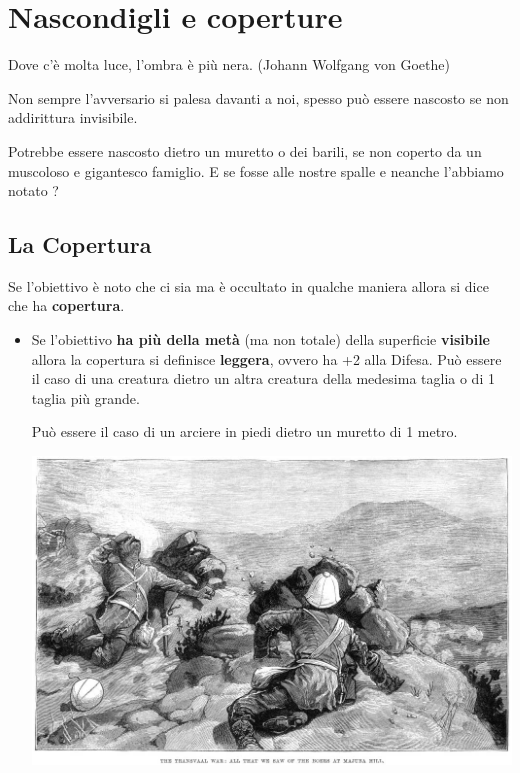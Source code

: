 \section{Nascondigli e coperture} 

\begin{enfasi}
Dove c'è molta luce, l'ombra è più nera. (Johann Wolfgang von Goethe)
\end{enfasi}

\begin{multicols}{2}

Non sempre l'avversario si palesa davanti a noi, spesso può essere nascosto se non addirittura invisibile.

Potrebbe essere nascosto dietro un muretto o dei barili, se non coperto da un muscoloso e gigantesco famiglio.
E se fosse alle nostre spalle e neanche l'abbiamo notato ?

\subsection{La Copertura} \label{copertura}\hypertarget{copertura}{}

Se l'obiettivo è noto che ci sia ma è occultato in qualche maniera allora si dice che ha \textbf{copertura}.

\begin{itemize}[leftmargin=*] \setlength{\itemsep}{0pt}
\item
Se l'obiettivo \textbf{ha più della metà} (ma non totale) della superficie \textbf{visibile} allora la copertura si definisce \textbf{leggera}, ovvero ha +2 alla Difesa. Può essere il caso di una creatura dietro un altra creatura della medesima taglia o di 1 taglia più grande.

Può essere il caso di un arciere in piedi dietro un muretto di 1 metro.

\begin{center}
\includegraphics[width=0.9\linewidth]{immagini/hide.png}


\end{center}
\end{itemize}
\end{multicols}
